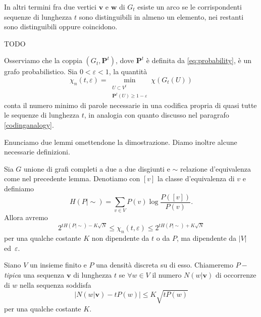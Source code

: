 In altri termini fra due vertici \(\mathbf{v}\) e \(\mathbf{w}\) di \(G_t\) esiste un arco se le corrispondenti sequenze di lunghezza \(t\) sono distinguibili in almeno un elemento, nei restanti sono distinguibili oppure coincidono.

\begin{example}
  TODO
\end{example}
Osserviamo che la coppia \((G_t, \mathbf{P}^t)\), dove \(\mathbf{P}^t\) è definita da \eqref{eq:probability}, è un grafo probabilistico. Sia \(0<\varepsilon <1\), la quantità
\[\chi_{n}(t,\varepsilon) = \min_{\substack{U\subset V^{t}\\\mathbf{P}^t(U)\ge 1-\varepsilon}} \chi(G_{t}(U))\]
conta il numero minimo di parole necessarie in una codifica propria di quasi tutte le sequenze di lunghezza \(t\), in analogia con quanto discusso nel paragrafo \ref{codinganalogy}.

Enunciamo due lemmi omettendone la dimostrazione. Diamo inoltre alcune necessarie definizioni. 
\begin{lemma}
	\label{boundslemma} Sia \(G\) unione di grafi completi a due a due disgiunti e \(\sim\) relazione d'equivalenza come nel precedente lemma. Denotiamo con \([v]\) la classe d'equivalenza di \(v\) e definiamo
	\[H(P\mid \sim)=\sum_{v\in V} P(v)\log{\frac{P([v])}{P(v)}}.\]
	Allora avremo
	\[2^{tH(P\mid \sim)-K\sqrt{N}}\le \chi_{n}(t,\varepsilon)\le 2^{tH(P\mid \sim)+K\sqrt{N}}\]
	per una qualche costante \(K\) non dipendente da \(t\) o da \(P\), ma dipendente da \(|V|\) ed\ \(\varepsilon\). 
\end{lemma}
\begin{definition}
	Siano \(V\) un insieme finito e \(P\) una densità discreta su di esso. Chiameremo \emph{\(P-\)tipica} una sequenza \(\mathbf{v}\) di lunghezza \(t\) se \(\forall w\in V\) il numero \(N(w\vert \mathbf{v})\) di occorrenze di \(w\) nella sequenza soddisfa
	\[\Big| N(w\vert\mathbf{v}) - tP(w)\Big|\le K\sqrt{tP(w)}\]
	per una qualche costante \(K\). 
\end{definition}

